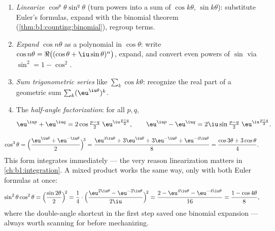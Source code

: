 \begin{method}\label{met:b1:complex:trig}
\begin{enumerate}
  \item \emph{Linearize} $\cos^p\theta \sin^q\theta$ (turn powers into
        a sum of $\cos k\theta$, $\sin k\theta$): substitute Euler's
        formulas, expand with the binomial theorem
        (\cref{thm:b1:counting:binomial}), regroup  terms.
  \item \emph{Expand} $\cos n\theta$ as a polynomial in $\cos\theta$:
        write $\cos n\theta = \Re\bigl((\cos\theta +
        \iu\sin\theta)^n\bigr)$, expand, and convert even powers of
        $\sin$ via $\sin^2 = 1 - \cos^2$.
  \item \emph{Sum trigonometric series} like $\sum_k \cos k\theta$:
        recognize the real part of a geometric sum $\sum_k
        (\eu^{\iu\theta})^k$.
  \item The \emph{half-angle factorization}: for all $p, q$,
        \[
        \eu^{\iu p} + \eu^{\iu q}
        = 2 \cos\tfrac{p - q}{2}\; \eu^{\iu \frac{p+q}{2}},
        \qquad
        \eu^{\iu p} - \eu^{\iu q}
        = 2\iu \sin\tfrac{p - q}{2}\; \eu^{\iu \frac{p+q}{2}} .
        \]
\end{enumerate}
\end{method}

\begin{example}[Linearization]\label{ex:b1:complex:linearize}
\[
\cos^3\theta
= \Bigl(\frac{\eu^{\iu\theta} + \eu^{-\iu\theta}}{2}\Bigr)^{\!3}
= \frac{\eu^{3\iu\theta} + 3\eu^{\iu\theta} + 3\eu^{-\iu\theta} +
\eu^{-3\iu\theta}}{8}
= \frac{\cos 3\theta + 3\cos\theta}{4}.
\]
This form integrates immediately --- the very reason linearization
matters in \cref{ch:b1:integration}. A mixed product works the
same way, only with both Euler formulas at once:
\[
\sin^2\theta\cos^2\theta
= \Bigl(\frac{\sin2\theta}2\Bigr)^{\!2}
= \frac{1}{4}\cdot
\Bigl(\frac{\eu^{2\iu\theta} - \eu^{-2\iu\theta}}{2\iu}
\Bigr)^{\!2}
= \frac{2 - \eu^{4\iu\theta} - \eu^{-4\iu\theta}}{16}
= \frac{1 - \cos4\theta}{8} ,
\]
where the double-angle shortcut in the first step saved one
binomial expansion --- always worth scanning for before
mechanizing.
\end{example}

